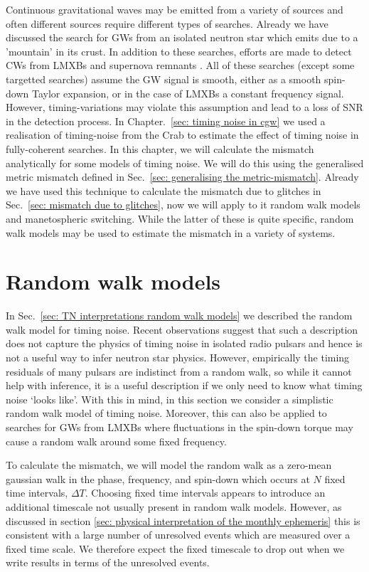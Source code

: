\documentclass[../full_thesis/full_thesis.tex]{subfiles}
\begin{document}
Continuous gravitational waves may be emitted from a variety of sources and
often different sources require different types of searches.  Already we have
discussed the search for GWs from an isolated neutron star which emits due to a
'mountain' in its crust. In addition to these searches, efforts are made to
detect CWs from LMXBs \citep{ligo2015scox1} and supernova remnants
\citep{ligo_SNR2015}. All of these searches (except some targetted searches)
assume the GW signal is smooth, either as a smooth spin-down Taylor expansion,
or in the case of LMXBs a constant frequency signal. However, timing-variations
may violate this assumption and lead to a loss of SNR in the detection process.
In Chapter.~\ref{sec: timing noise in cgw} we used a realisation of
timing-noise from the Crab to estimate the effect of timing noise in
fully-coherent searches. In this chapter, we will calculate the mismatch
analytically for some models of timing noise. We will do this using the
generalised metric mismatch defined in Sec.~\ref{sec: generalising the
metric-mismatch}. Already we have used this technique to calculate the mismatch
due to glitches in Sec.~\eqref{sec: mismatch due to glitches}, now we will
apply to it random walk models and manetospheric switching. While the latter of
these is quite specific, random walk models may be used to estimate the
mismatch in a variety of systems.

\section{Random walk models}
\label{sec: random walk models}

In Sec.~\ref{sec: TN interpretations random walk models} we described the
random walk model for timing noise. Recent observations \citep{Hobbs2010}
suggest that such a description does not capture the physics of timing noise
in isolated radio pulsars and hence is not a useful way to infer neutron star
physics. However, empirically the timing residuals of many pulsars are indistinct
from a random walk, so while it cannot help with inference, it is a useful
description if we only need to know what timing noise `looks like'. With this
in mind, in this section we consider a simplistic random walk model of timing noise.
Moreover, this can also be applied to searches for GWs from LMXBs where
fluctuations in the spin-down torque may cause a random walk around some fixed
frequency.

To calculate the mismatch, we will model the random walk as a zero-mean
gaussian walk in the phase, frequency, and spin-down which occurs at $N$ fixed
time intervals, $\Delta T$. Choosing fixed time intervals appears to introduce
an additional timescale not usually present in random walk models. However, as
discussed in section \ref{sec: physical interpretation of the monthly
ephemeris} this is consistent with a large number of unresolved events which
are measured over a fixed time scale. We therefore expect the fixed timescale
to drop out when we write results in terms of the unresolved events.
\end{document}
